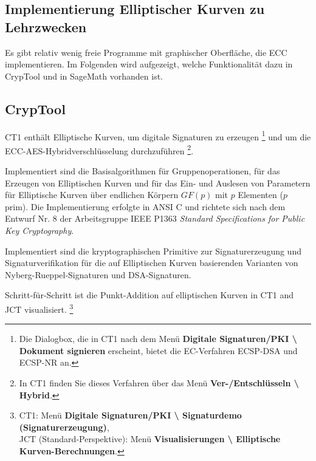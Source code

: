 \begin{refsegment}
\section{Implementierung Elliptischer Kurven zu Lehrzwecken}
\label{ec:Implementing-for-Education}

Es gibt relativ wenig freie Programme mit graphischer Oberfläche, die ECC implementieren.
Im Folgenden wird aufgezeigt, welche Funktionalität
dazu in CrypTool und in SageMath vorhanden ist.


\subsection{CrypTool}

CT1 enthält Elliptische Kurven, um digitale Signaturen zu erzeugen%
\footnote{%
Die Dialogbox, die in CT1 nach dem Menü
\textbf{Digitale Signaturen/PKI \textbackslash{} Dokument signieren} erscheint,
bietet die EC-Verfahren ECSP-DSA und ECSP-NR an.
} und um die ECC-AES-Hybridverschlüsselung durchzuführen%
\footnote{%
In CT1 finden Sie dieses Verfahren über das Menü
\textbf{Ver-/Entschlüsseln \textbackslash{} Hybrid}.
}.

Implementiert sind die Basisalgorithmen für Gruppenoperationen, für das
Erzeugen von Elliptischen Kurven und für das Ein- und Auslesen von
Parametern für Elliptische Kurven über endlichen Körpern $GF(p)$
mit $p$ Elementen ($p$ prim). Die Implementierung erfolgte in
ANSI C und richtete sich nach dem Entwurf Nr. 8 der Arbeitsgruppe
IEEE P1363 {\em Standard Specifications for Public Key Cryptography}.

Implementiert sind die kryptographischen Primitive zur Signaturerzeugung
und Signaturverifikation für die auf Elliptischen Kurven basierenden
Varianten von Nyberg-Rueppel-Signaturen und  DSA-Signaturen.

Schritt-für-Schritt ist die Punkt-Addition auf elliptischen Kurven
in CT1 and JCT visualisiert.%
\footnote{%
  CT1: Menü \textbf{Digitale Signaturen/PKI \textbackslash{} Signaturdemo
  (Signaturerzeugung)},\\
  JCT (Standard-Perspektive): Menü \textbf{Visualisierungen \textbackslash{}
  Elliptische Kurven-Berechnungen}.
}



\end{refsegment}
